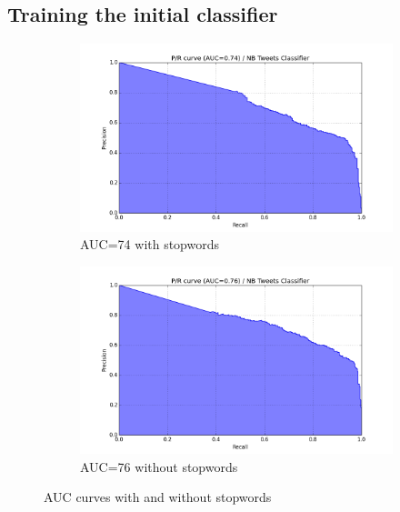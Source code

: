 \subsection{Training the initial classifier}
\begin{figure}
  \centering
  \begin{subfigure}[b]{0.49\linewidth}
    \includegraphics[width=\linewidth]{figures/pr_NB_Tweets_Classifier_01}
  \caption{AUC=74 with stopwords}
  \label{fig:auc_with_stopwords}
  \end{subfigure}
  \begin{subfigure}[b]{0.49\linewidth}
      \includegraphics[width=\linewidth]{figures/pr_NB_Tweets_Classifier_02}
  \caption{AUC=76 without stopwords}
  \label{fig:auc_without_stopwords}
  \end{subfigure}

\caption{AUC curves with and without stopwords}
\label{fig:auc_curves_stopwords}
\end{figure}

